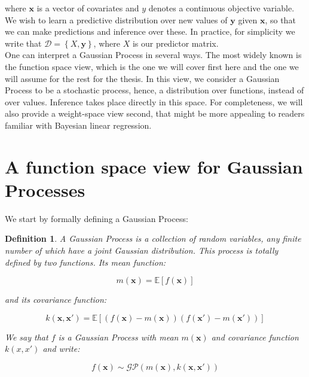 \documentclass[10pt,a4paper,twoside]{book}
\newtheorem{defini}{Definition}
\begin{document}
where $\boldsymbol{x}$ is a vector of covariates and $y$ denotes a continuous objective variable. We wish to learn a predictive distribution over new values of $\boldsymbol{y}$ given $\boldsymbol{x}$, so that we can make predictions and inference over these. In practice, for simplicity we write that $\mathcal{D} = \left\lbrace X, \boldsymbol{y}\right\rbrace$, where $X$ is our predictor matrix.\\

One can interpret a Gaussian Process in several ways. The most widely known is the function space view, which is the one we will cover first here and the one we will assume for the rest for the thesis. In this view, we consider a Gaussian Process to be a stochastic process, hence, a distribution over functions, instead of over values. Inference takes place directly in this space. For completeness, we will also provide a weight-space view second, that might be more appealing to readers familiar with Bayesian linear regression.\\



\section{A function space view for Gaussian Processes}

We start by formally defining a Gaussian Process:

\begin{defini}
A Gaussian Process is a collection of random variables, any finite number of which have a joint Gaussian distribution. This process is totally defined by two functions. Its \textit{mean function}:

\begin{equation}
m(\boldsymbol{x}) = \mathbb{E}\left[f(\boldsymbol{x})\right]
\end{equation} 

and its \textit{covariance function}:

\begin{equation}
k(\boldsymbol{x}, \boldsymbol{x'}) = \mathbb{E}\left[\left( f(\boldsymbol{x}) - m(\boldsymbol{x}) \right)\left( f(\boldsymbol{x}') - m(\boldsymbol{x}')\right)\right]
\end{equation}


We say that $f$ is a Gaussian Process with mean $m(\boldsymbol{x})$ and covariance function $k(x, x')$ and write:

\begin{equation}
f(\boldsymbol{x}) \sim \mathcal{GP}\left(m(\boldsymbol{x}), k(\boldsymbol{x}, \boldsymbol{x'}) \right)
\end{equation}
\end{defini}
\end{document}
